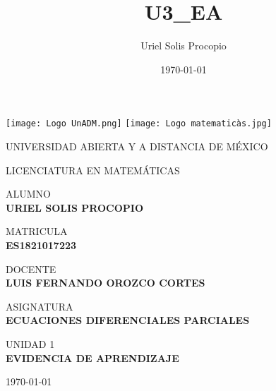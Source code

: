 \documentclass{article}
\title{U3_EA}
\author{Uriel Solis Procopio}
\date{\today}
\begin{document}
\thispagestyle{empty}
	
	\texttt{[image: Logo UnADM.png]}
	\texttt{[image: Logo matematicàs.jpg]}
	
	\begin{center}
	\vspace{0.8cm}
	\LARGE
	UNIVERSIDAD ABIERTA Y A DISTANCIA DE MÉXICO 
	
	\vspace{0.8cm}
	\LARGE
	LICENCIATURA EN MATEMÁTICAS 
	
    \vspace{1.1cm}
	\normalsize	
	ALUMNO \\
	\vspace{.3cm}
	\large
	\textbf{URIEL SOLIS PROCOPIO}

	\vspace{1.1cm}
	\normalsize	
	MATRICULA \\
	\vspace{.3cm}
	\large
	\textbf{ES1821017223}
	
	\vspace{1.1cm}
	\normalsize	
	DOCENTE \\
	\vspace{.3cm}
	\large
	\textbf{LUIS FERNANDO OROZCO CORTES}
	
	\vspace{1.1cm}
	\normalsize	
	ASIGNATURA \\
	\vspace{.3cm}
	\large
	\textbf{ECUACIONES DIFERENCIALES PARCIALES}
	
	\vspace{1.1cm}
	\normalsize	
	UNIDAD 1 \\
	\vspace{.3cm}
	\large
	\textbf{EVIDENCIA DE APRENDIZAJE}
	
	\vspace{1.1cm}
	\today
	\end{center}
	
	\newpage
	
	\setcounter{page}{2}
	\pagestyle{plain}
		
\end{document}

